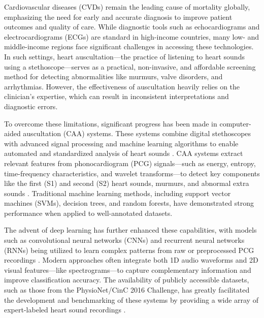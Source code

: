 Cardiovascular diseases (CVDs) remain the leading cause of mortality globally, emphasizing the need for early and accurate diagnosis to improve patient outcomes and quality of care. While diagnostic tools such as echocardiograms and electrocardiograms (ECGs) are standard in high-income countries, many low- and middle-income regions face significant challenges in accessing these technologies. In such settings, heart auscultation—the practice of listening to heart sounds using a stethoscope—serves as a practical, non-invasive, and affordable screening method for detecting abnormalities like murmurs, valve disorders, and arrhythmias. However, the effectiveness of auscultation heavily relies on the clinician's expertise, which can result in inconsistent interpretations and diagnostic errors.

To overcome these limitations, significant progress has been made in computer-aided auscultation (CAA) systems. These systems combine digital stethoscopes with advanced signal processing and machine learning algorithms to enable automated and standardized analysis of heart sounds \cite{swarup2018digital}. CAA systems extract relevant features from phonocardiogram (PCG) signals—such as energy, entropy, time-frequency characteristics, and wavelet transforms—to detect key components like the first (S1) and second (S2) heart sounds, murmurs, and abnormal extra sounds \cite{li2020review, qian2019deep}. Traditional machine learning methods, including support vector machines (SVMs), decision trees, and random forests, have demonstrated strong performance when applied to well-annotated datasets.

The advent of deep learning has further enhanced these capabilities, with models such as convolutional neural networks (CNNs) and recurrent neural networks (RNNs) being utilized to learn complex patterns from raw or preprocessed PCG recordings \cite{winther2021advanced, clifford2016classification}. Modern approaches often integrate both 1D audio waveforms and 2D visual features—like spectrograms—to capture complementary information and improve classification accuracy. The availability of publicly accessible datasets, such as those from the PhysioNet/CinC 2016 Challenge, has greatly facilitated the development and benchmarking of these systems by providing a wide array of expert-labeled heart sound recordings \cite{clifford2016classification, liu2016openaccess}.


